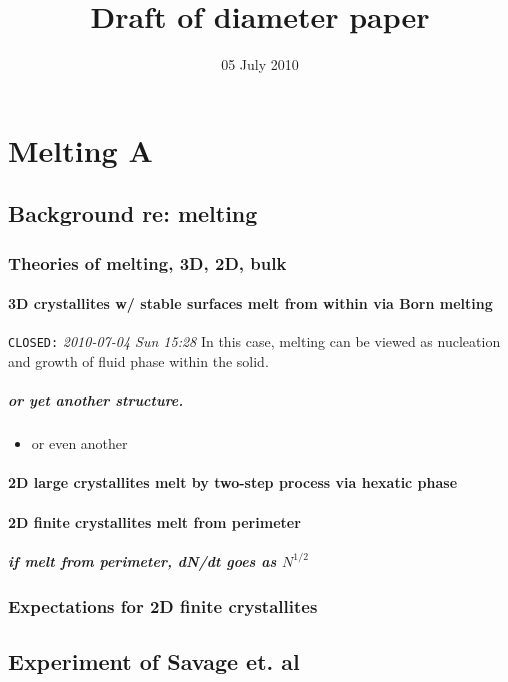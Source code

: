 \documentclass{article}
\title{Draft of diameter paper}
\date{05 July 2010}
\begin{document}
\setcounter{tocdepth}{5}
\tableofcontents

\section{Melting A}
\label{sec-1}
\subsection{Background re: melting}
\label{sec-1.1}
\subsubsection{Theories of melting, 3D, 2D, bulk}
\label{sec-1.1.1}
\paragraph{3D crystallites w/ stable surfaces melt from within via Born melting}
\label{sec-1.1.1.1}

     \texttt{CLOSED:} \textit{2010-07-04 Sun 15:28}\newline
In this case, melting can be viewed as nucleation and growth of fluid phase within the solid.
\subparagraph{or yet another structure.}
\label{sec-1.1.1.1.1}
\begin{itemize}

\item or even another\\
\label{sec-1.1.1.1.1.1}%
\end{itemize} %
\paragraph{2D large crystallites melt by two-step process via hexatic phase}
\label{sec-1.1.1.2}
\paragraph{2D finite crystallites melt from perimeter}
\label{sec-1.1.1.3}
\subparagraph{if melt from perimeter, dN/dt goes as $N^{1/2}$}
\label{sec-1.1.1.3.1}
\subsubsection{Expectations for 2D finite crystallites}
\label{sec-1.1.2}
\subsection{Experiment of Savage et. al}
\label{sec-1.2}
\end{document}
